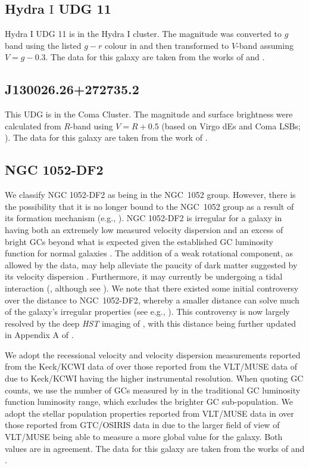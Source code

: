 \subsection{Hydra $\mathrm{I}$ UDG 11}
Hydra $\mathrm{I}$ UDG 11 is in the Hydra $\mathrm{I}$ cluster. The magnitude was converted to $g$ band using the listed $g-r$ colour in \citet{Iodice2020} and then transformed to $V$-band assuming $V = g-0.3$. The data for this galaxy are taken from the works of \citet{Iodice2020} and \citet{Iodice2023}.

\subsection{J130026.26+272735.2}
This UDG is in the Coma Cluster. The magnitude and surface brightness were calculated from $R$-band using $V=R+0.5$ (based on Virgo dEs and Coma LSBs; \citealp{vanZee2004, Alabi2020}). The data for this galaxy are taken from the work of \citet{Chilingarian2019}.

\subsection{NGC 1052-DF2}
We classify NGC 1052-DF2 as being in the NGC~1052 group. However, there is the possibility that it is no longer bound to the NGC~1052 group as a result of its formation mechanism (e.g., \citealp{Shen2021, vanDokkum2022}). NGC 1052-DF2 is irregular for a galaxy in having both an extremely low measured velocity dispersion \citep{vanDokkum2018, Danieli2019} and an excess of bright GCs beyond what is expected given the established GC luminosity function for normal galaxies \citep{vanDokkum2018b, Shen2021}. The addition of a weak rotational component, as allowed by the data, may help alleviate the paucity of dark matter suggested by its velocity dispersion \citep{Emsellem2019, Lewis2020, Montes2021}. Furthermore, it may currently be undergoing a tidal interaction (\citealp{Keim2021}, although see \citealp{Montes2021, Golini2024}). We note that there existed some initial controversy over the distance to NGC~1052-DF2, whereby a smaller distance can solve much of the galaxy's irregular properties (see e.g., \citealp{Trujillo2019, Monelli2019}). This controversy is now largely resolved by the deep \textit{HST} imaging of \citet{Shen2021}, with this distance being further updated in Appendix A of \citet{Shen2023}.

We adopt the recessional velocity and velocity dispersion measurements reported from the Keck/KCWI data of \citet{Danieli2019} over those reported from the VLT/MUSE data of \citet{Emsellem2019} due to Keck/KCWI having the higher instrumental resolution. When quoting GC counts, we use the number of GCs measured by \citet{Shen2021} in the traditional GC luminosity function luminosity range, which excludes the brighter GC sub-population. We adopt the stellar population properties reported from VLT/MUSE data in \citet{Fensch2019} over those reported from GTC/OSIRIS data in \citet{RuizLara2019} due to the larger field of view of VLT/MUSE being able to measure a more global value for the galaxy. Both values are in agreement. The data for this galaxy are taken from the works of \citet{vanDokkum2018, Fensch2019, Danieli2019, Shen2021} and \citet{Shen2023}.

